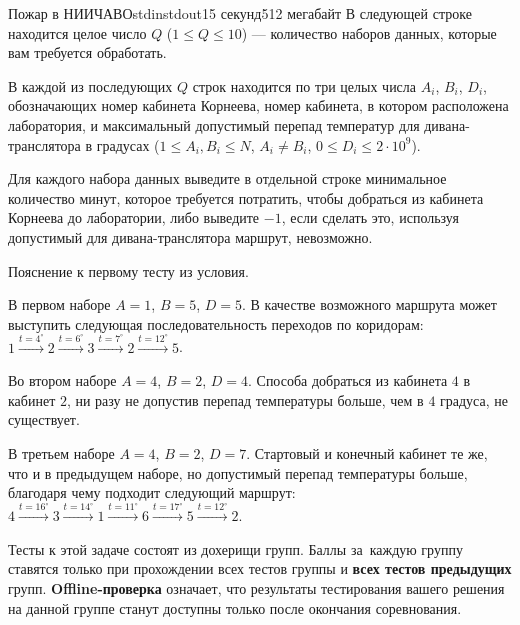 \begin{problem}{Пожар в НИИЧАВО}{stdin}{stdout}{15 секунд}{512 мегабайт}
В следующей строке находится целое число $Q$ ($1 \leq Q \leq 10$) --- количество наборов данных, которые вам требуется обработать.

В каждой из последующих $Q$ строк находится по три целых числа $A_i$, $B_i$, $D_i$, обозначающих номер кабинета Корнеева, номер кабинета, в котором расположена лаборатория, и максимальный допустимый перепад температур для дивана-транслятора в градусах ($1 \leq A_i, B_i \leq N$, $A_i \neq B_i$, $0 \leq D_i \leq 2 \cdot 10^9$).

\OutputFile
Для каждого набора данных выведите в отдельной строке минимальное количество минут, которое требуется потратить, чтобы добраться из кабинета Корнеева до лаборатории, либо выведите $-1$, если сделать это, используя допустимый для дивана-транслятора маршрут, невозможно.

\Examples

\begin{example}
%
\end{example}

\Note
Пояснение к первому тесту из условия.

В первом наборе $A = 1$, $B = 5$, $D = 5$. В качестве возможного маршрута может выступить следующая последовательность переходов по коридорам: 
$1 \xrightarrow{t = 4^\circ} 
 2 \xrightarrow{t = 6^\circ} 
 3 \xrightarrow{t = 7^\circ} 
 2 \xrightarrow{t = 12^\circ} 
 5$.

Во втором наборе $A = 4$, $B = 2$, $D = 4$. Способа добраться из кабинета $4$ в кабинет $2$, ни разу не допустив перепад температуры больше, чем в $4$ градуса, не существует.

В третьем наборе $A = 4$, $B = 2$, $D = 7$. Стартовый и конечный кабинет те же, что и в предыдущем наборе, но допустимый перепад температуры больше, благодаря чему подходит следующий маршрут: 
$4 \xrightarrow{t = 16^\circ}
 3 \xrightarrow{t = 14^\circ}
 1 \xrightarrow{t = 11^\circ}
 6 \xrightarrow{t = 17^\circ}
 5 \xrightarrow{t = 12^\circ}
 2$.

\Scoring

Тесты к этой задаче состоят из дохерищи групп. Баллы за~каждую группу ставятся только при прохождении всех тестов группы и \textbf{всех тестов предыдущих} групп. \textbf{Offline-проверка} означает, что результаты тестирования вашего решения на данной группе станут доступны только после окончания соревнования.


\medskip


\end{problem}
